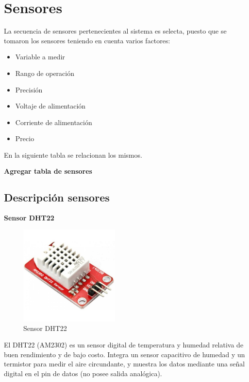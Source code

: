 \vspace{2cm}

\section{Sensores} \label{sec: sensores}

    La secuencia de sensores pertenecientes al sistema es selecta, puesto que se tomaron los sensores teniendo en cuenta varios factores:

    \begin{itemize}
        \item Variable a medir
        \item Rango de operación
        \item Precisión
        \item Voltaje de alimentación
        \item Corriente de alimentación
        \item Precio
    \end{itemize}

En la siguiente tabla se relacionan los mismos.

\textbf{Agregar tabla de sensores}

\subsection{Descripción sensores} \label{subsec: descripcion_sensores}


\textbf{Sensor DHT22} %

  \begin{figure}[h]
      \centering
      \includegraphics[width=5cm, height=5cm]{imagenes/dht22.jpg}
      \caption{Sensor DHT22}
      \label{imag:dht22}
   \end{figure}
   
El DHT22 (AM2302) es un sensor digital de temperatura y humedad relativa de buen rendimiento y de bajo costo. Integra un sensor capacitivo de humedad y un termistor para medir el aire circundante, y muestra los datos mediante una señal digital en el pin de datos (no posee salida analógica).\\

